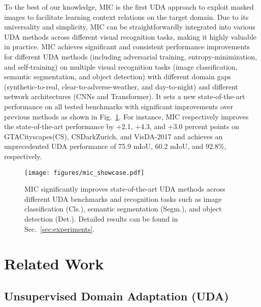 \documentclass[10pt,twocolumn,letterpaper]{article}
\begin{document}
To the best of our knowledge, MIC is the first UDA approach to exploit masked images to facilitate learning context relations on the target domain. Due to its universality and simplicity, MIC can be straightforwardly integrated into various UDA methods across different visual recognition tasks, making it highly valuable in practice. MIC achieves significant and consistent performance improvements for different UDA methods (including adversarial training, entropy-minimization, and self-training) on multiple visual recognition tasks (image classification, semantic segmentation, and object detection) with different domain gaps (synthetic-to-real, clear-to-adverse-weather, and day-to-night) and different network architectures (CNNs and Transformer). It sets a new state-of-the-art performance on all tested benchmarks with significant improvements over previous methods as shown in Fig.~\ref{fig:showcase_results}. For instance, MIC respectively improves the state-of-the-art performance by +2.1, +4.3, and +3.0 percent points on GTACityscapes(CS), CSDarkZurich, and VisDA-2017 and achieves an unprecedented UDA performance of 75.9 mIoU, 60.2 mIoU, and 92.8\%, respectively.

\begin{figure}
    \centering
    \texttt{[image: figures/mic\_showcase.pdf]}
    \caption{MIC significantly improves state-of-the-art UDA methods across different UDA benchmarks and recognition tasks such as image classification (Cls.), semantic segmentation (Segm.), and object detection (Det.). Detailed results can be found in Sec.~\ref{sec:experiments}.}
    \label{fig:showcase_results}
\end{figure} 
\section{Related Work}
\label{sec:related}

\subsection{Unsupervised Domain Adaptation (UDA)}
\end{document}
